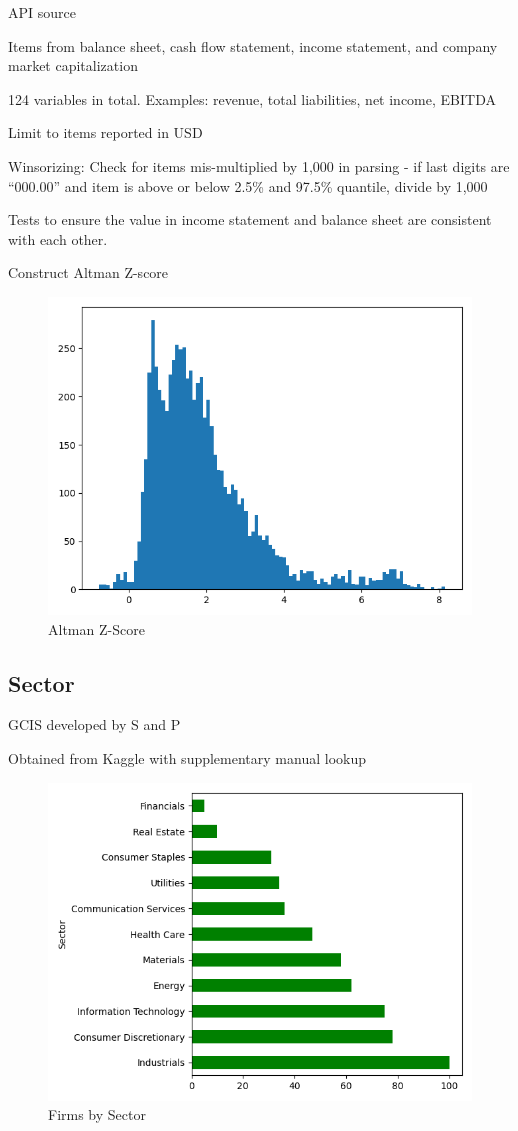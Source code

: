 \documentclass{article}
\begin{document}
    API source

    Items from balance sheet, cash flow statement, income statement, and company market capitalization
    
    124 variables in total. Examples: revenue, total liabilities, net income, EBITDA
    
    Limit to items reported in USD
    
    Winsorizing: Check for items mis-multiplied by 1,000 in parsing - if last digits are “000.00” and item is above or below 2.5\% and 97.5\% quantile, divide by 1,000

    Tests to ensure the value in income statement and balance sheet are consistent with each other.

    Construct Altman Z-score

    \begin{figure}[h!]
		\centering
        \caption{Altman Z-Score}
        \includegraphics[width=0.5\linewidth,keepaspectratio=true]{../Output/All Data EDA/Tabular EDA/altman_z_score_all_data_no_title.png}
	\end{figure}    

    \subsection*{Sector}

    GCIS developed by S and P

    Obtained from Kaggle with supplementary manual lookup

    \begin{figure}[h!]
		\centering
        \caption{Firms by Sector}
        \includegraphics[width=0.5\linewidth,keepaspectratio=true]{../Output/All Data EDA/Tabular EDA/all_data_fixed_quarter_dates_firms_by_sector_no_title.png}
	\end{figure}
\end{document}
